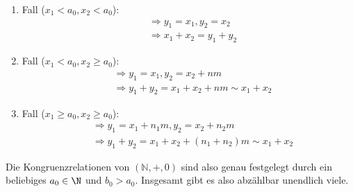 \begin{solution}
\begin{itemize}
\begin{enumerate}[label = \textit{\arabic*.}]
\item Fall ($x_1 < a_0, x_2 < a_0$):
\begin{align*}
  &\Rightarrow y_1 = x_1, y_2 = x_2 \\
  &\Rightarrow x_1 + x_2 = y_1 + y_2
\end{align*}
\item Fall ($x_1 < a_0, x_2 \geq a_0$):
\begin{align*}
  &\Rightarrow y_1 = x_1, y_2 = x_2 + nm \\
  &\Rightarrow  y_1 + y_2 = x_1 + x_2 + nm \sim x_1 + x_2
\end{align*}
\item Fall ($x_1 \geq a_0, x_2 \geq a_0$):
\begin{align*}
  &\Rightarrow y_1 = x_1 + n_1 m, y_2 = x_2 + n_2 m \\
  &\Rightarrow  y_1 + y_2 = x_1 + x_2 + (n_1+n_2) m \sim x_1 + x_2
\end{align*}
\end{enumerate}

Die Kongruenzrelationen von $(\mathbb{N},+,0)$ sind also genau festgelegt durch ein beliebiges $a_0 \in \N$ und $b_0 > a_0$. Insgesamt gibt es also abzählbar unendlich viele.


\end{itemize}
\end{solution}
